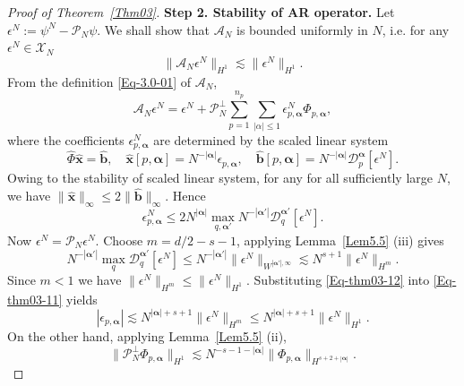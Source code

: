 \documentclass{sn-jnl}%
\numberwithin{equation}{section}
\theoremstyle{thmstyleone}%
\theoremstyle{thmstyletwo}%
\theoremstyle{thmstylethree}%
\begin{document}
\begin{proof}[Proof of Theorem~\ref{Thm03}]
    \textbf{Step 2. Stability of AR operator.} Let $\epsilon^N:=\psi^N-\mathcal{P}_N\psi$. We shall show that $\mathcal{A}_N$ is bounded uniformly in $N$, i.e. for any $\epsilon^N\in \mathscr{X}_N$ 
    \begin{equation}\label{Eq-thm03-09}
        \big\|\mathcal{A}_N \epsilon^N\big\|_{H^{1}}\lesssim \big\| \epsilon^N\big\|_{H^{1}}.
    \end{equation}
    From the definition \eqref{Eq-3.0-01} of $\mathcal{A}_N$, 
    \begin{equation}\label{Eq-thm03-10}
        \mathcal{A}_N \epsilon^N  = \epsilon^N + \mathcal{P}_N^\perp\sum_{p=1}^{n_p}\sum_{|\alpha|\leq 1}\epsilon^N_{p,\bm \alpha}\Phi_{p,\bm \alpha},
    \end{equation}
    where the coefficients $\epsilon_{p,\bm \alpha}^N$ are determined by the scaled linear system
    \[
    \hat{\Phi} \bm{\hat{x}}= \bm{\hat{b}},\quad \bm{\hat{x}}[p,\bm \alpha]=N^{-|\bm \alpha|}\epsilon_{p,\bm\alpha},\quad \bm{\hat{b}}[p,\bm \alpha]=N^{-|\bm \alpha|}\mathcal{D}_{p}^{\bm \alpha}[\epsilon^N].
    \]
    Owing to the stability of scaled linear system, for any for all sufficiently large $N$, we have $\| \bm{\hat{x}}\|_{\infty} \leq 2\bigl\| \bm{\hat{b}}\|_{\infty}$. Hence  
    \begin{equation}\label{Eq-thm03-11}
        \epsilon_{p,\bm \alpha}^N\leq 2N^{|\bm \alpha|}\max_{q,\bm \alpha'} N^{-|\bm \alpha'|}\mathcal{D}_q^{\bm \alpha'}[\epsilon^N].
    \end{equation}
    Now $\epsilon^N = \mathcal{P}_N\epsilon^N$. Choose $m = d/2-s-1$, applying  Lemma~\ref{Lem5.5} (iii) gives
    \begin{equation}\label{Eq-thm03-12}
        N^{-|\bm \alpha'|}\max_{q} \mathcal{D}_q^{\bm \alpha'}[\epsilon^N] \leq N^{-|\bm \alpha'|}\bigl\|\epsilon^N\bigr\|_{W^{|\bm \alpha'|,\infty}}\lesssim N^{s+1}\bigl\|\epsilon^N\bigr\|_{H^m}.
    \end{equation}
    Since $m < 1$ we have $\bigl\|\epsilon^N\bigr\|_{H^m}\le\bigl\|\epsilon^N\bigr\|_{H^1}$. Substituting \eqref{Eq-thm03-12} into \eqref{Eq-thm03-11} yields
    \begin{equation}\label{Eq-thm03-13}
        |\epsilon_{p,\bm \alpha}| \lesssim  N^{|\bm \alpha|+s+1}\bigl\|\epsilon^N\bigr\|_{H^m}\leq N^{|\bm \alpha|+s+1}\bigl\|\epsilon^N\bigr\|_{H^1}.
    \end{equation}
    On the other hand, applying Lemma~\ref{Lem5.5} (ii),
    \begin{equation}\label{Eq-thm03-14}
        \bigl\|\mathcal{P}^\perp_N \Phi_{p,\bm \alpha}\bigr\|_{H^1} \lesssim N^{-s-1-|\bm \alpha|}\bigl\| \Phi_{p,\bm \alpha}\bigr\|_{H^{s+2+|\bm \alpha|}}.

\end{equation}
\end{proof}
\end{document}
